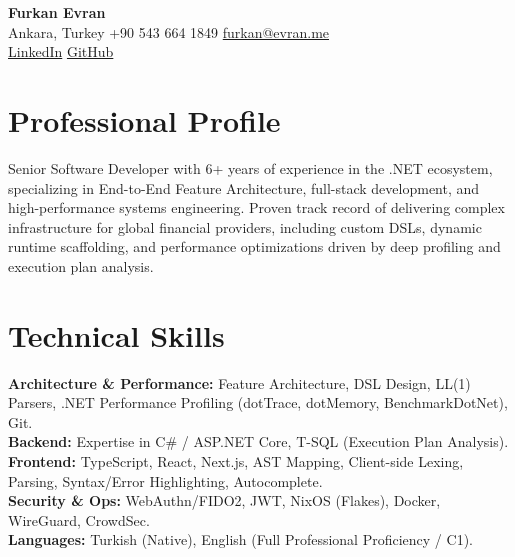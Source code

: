\documentclass[11pt, a4paper]{article}
\begin{document}
\begin{center}
{\Huge \textbf{Furkan Evran}} \\[2pt]
Ankara, Turkey \textbar{} +90 543 664 1849 \textbar{} 
\href{mailto:furkan@evran.me}{furkan@evran.me} \\
\href{https://linkedin.com/in/furkan-evran}{LinkedIn} \textbar{} 
\href{https://github.com/furkanevran}{GitHub}
\end{center}

\section*{Professional Profile}
\noindent Senior Software Developer with 6+ years of experience in the .NET ecosystem, specializing in End-to-End Feature Architecture, full-stack development, and high-performance systems engineering. Proven track record of delivering complex infrastructure for global financial providers, including custom DSLs, dynamic runtime scaffolding, and performance optimizations driven by deep profiling and execution plan analysis.

\section*{Technical Skills}
\noindent\textbf{Architecture \& Performance:} Feature Architecture, DSL Design, LL(1) Parsers, .NET Performance Profiling (dotTrace, dotMemory, BenchmarkDotNet), Git. \\[4pt]
\textbf{Backend:} Expertise in C\# / ASP.NET Core, T-SQL (Execution Plan Analysis). \\[4pt]
\textbf{Frontend:} TypeScript, React, Next.js, AST Mapping, Client-side Lexing, Parsing, Syntax/Error Highlighting, Autocomplete. \\[4pt]
\textbf{Security \& Ops:} WebAuthn/FIDO2, JWT, NixOS (Flakes), Docker, WireGuard, CrowdSec. \\[4pt]
\textbf{Languages:} Turkish (Native), English (Full Professional Proficiency / C1).
\end{document}
